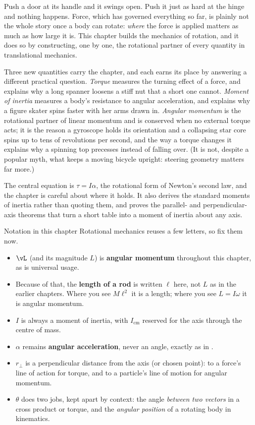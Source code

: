 \label{ch:rotation}

Push a door at its handle and it swings open. Push it just as hard at the hinge and nothing happens. Force,
which has governed everything so far, is plainly not the whole story once a body can rotate: \emph{where} the
force is applied matters as much as how large it is. This chapter builds the mechanics of rotation, and it does
so by constructing, one by one, the rotational partner of every quantity in translational mechanics.

Three new quantities carry the chapter, and each earns its place by answering a different practical question.
\emph{Torque} measures the turning effect of a force, and explains why a long spanner loosens a stiff nut that
a short one cannot. \emph{Moment of inertia} measures a body's resistance to angular acceleration, and explains
why a figure skater spins faster with her arms drawn in. \emph{Angular momentum} is the rotational partner of
linear momentum and is conserved when no external torque acts; it is the reason a gyroscope holds its orientation and a collapsing
star core spins up to tens of revolutions per second, and the way a torque changes it explains why a spinning top precesses instead of falling over. (It is not,
despite a popular myth, what keeps a moving bicycle upright: steering geometry matters far more.)

The central equation is $\tau=I\alpha$, the rotational form of Newton's second law, and the chapter is careful
about where it holds. It also derives the standard moments of inertia rather than quoting them, and proves
the parallel- and perpendicular-axis theorems that turn a short table into a moment of inertia about any axis.

\begin{remarkbox}{Notation in this chapter}
Rotational mechanics reuses a few letters, so fix them now.
\begin{itemize}
\item $\vL$ (and its magnitude $L$) is \textbf{angular momentum} throughout this chapter, as is
      universal usage.
\item Because of that, the \textbf{length of a rod} is written $\ell$ here, not $L$ as in the earlier
      chapters. Where you see $M\ell^{2}$ it is a length; where you see $L=I\omega$ it is angular
      momentum.
\item $I$ is always a moment of inertia, with $I_{\text{cm}}$ reserved for the axis through the centre
      of mass.
\item $\alpha$ remains \textbf{angular acceleration}, never an angle, exactly as in .
\item $r_\perp$ is a perpendicular distance from the axis (or chosen point): to a force's line of action
      for torque, and to a particle's line of motion for angular momentum.
\item $\theta$ does two jobs, kept apart by context: the angle \emph{between two vectors} in a cross
      product or torque, and the \emph{angular position} of a rotating body in kinematics.
\end{itemize}
\end{remarkbox}

